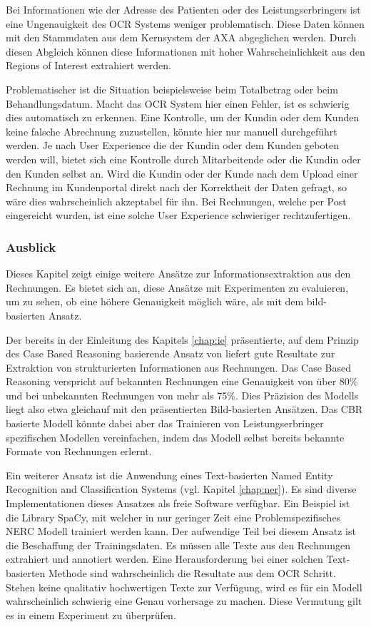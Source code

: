 Bei Informationen wie der Adresse des Patienten oder des Leistungserbringers ist eine Ungenauigkeit des OCR Systems weniger problematisch. Diese Daten können mit den Stammdaten aus dem Kernsystem der AXA abgeglichen werden. Durch diesen Abgleich können diese Informationen mit hoher Wahrscheinlichkeit aus den Regions of Interest extrahiert werden.

Problematischer ist die Situation beispielsweise beim Totalbetrag oder beim Behandlungsdatum. Macht das OCR System hier einen Fehler, ist es schwierig dies automatisch zu erkennen. Eine Kontrolle, um der Kundin oder dem Kunden keine falsche Abrechnung zuzustellen, könnte hier nur manuell durchgeführt werden. Je nach User Experience die der Kundin oder dem Kunden geboten werden will, bietet sich eine Kontrolle durch Mitarbeitende oder die Kundin oder den Kunden selbst an. Wird die Kundin oder der Kunde nach dem Upload einer Rechnung im Kundenportal direkt nach der Korrektheit der Daten gefragt, so wäre dies wahrscheinlich akzeptabel für ihn. Bei Rechnungen, welche per Post eingereicht wurden, ist eine solche User Experience schwieriger rechtzufertigen.




\subsubsection{Ausblick}

Dieses Kapitel zeigt einige weitere Ansätze zur Informationsextraktion aus den Rechnungen. Es bietet sich an, diese Ansätze mit Experimenten zu evaluieren, um zu sehen, ob eine höhere Genauigkeit möglich wäre, als mit dem bild-basierten Ansatz.

Der bereits in der Einleitung des Kapitels \ref{chap:ie} präsentierte, auf dem Prinzip des Case Based Reasoning basierende Ansatz von \textcite{Hamza} liefert gute Resultate zur Extraktion von strukturierten Informationen aus Rechnungen. Das Case Based Reasoning verspricht auf bekannten Rechnungen eine Genauigkeit von über 80\% und bei unbekannten Rechnungen von mehr als 75\%. Dies Präzision des Modells liegt also etwa gleichauf mit den präsentierten Bild-basierten Ansätzen. Das CBR basierte Modell könnte dabei aber das Trainieren von Leistungserbringer spezifischen Modellen vereinfachen, indem das Modell selbst bereits bekannte Formate von Rechnungen erlernt.

Ein weiterer Ansatz ist die Anwendung eines Text-basierten Named Entity Recognition and Classification Systems (vgl. Kapitel \ref{chap:ner}). Es sind diverse Implementationen dieses Ansatzes als freie Software verfügbar. Ein Beispiel ist die Library SpaCy, mit welcher in nur geringer Zeit eine Problemspezifisches NERC Modell trainiert werden kann. Der aufwendige Teil bei diesem Ansatz ist die Beschaffung der Trainingsdaten. Es müssen alle Texte aus den Rechnungen extrahiert und annotiert werden. Eine Herausforderung bei einer solchen Text-basierten Methode sind wahrscheinlich die Resultate aus dem OCR Schritt. Stehen keine qualitativ hochwertigen Texte zur Verfügung, wird es für ein Modell wahrscheinlich schwierig eine Genau vorhersage zu machen. Diese Vermutung gilt es in einem Experiment zu überprüfen.

